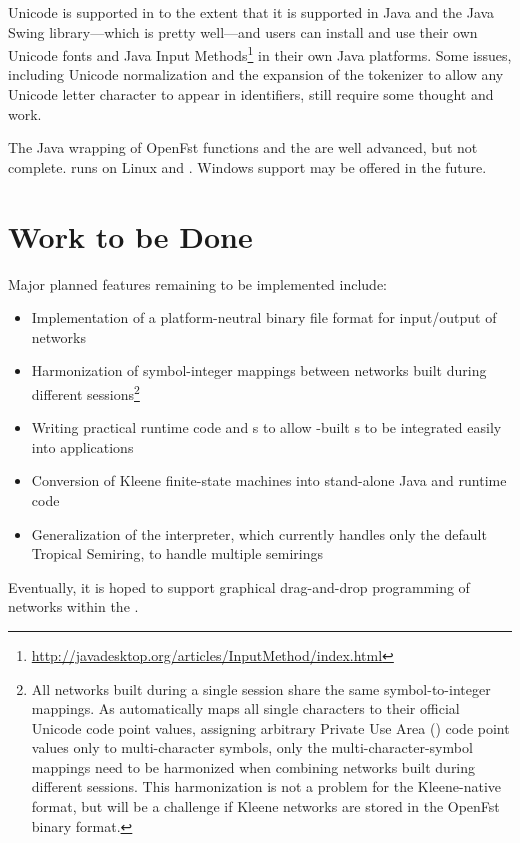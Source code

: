 \noindent
Unicode is supported in \Kleene{} to the extent that it is supported in
Java and the Java Swing library---which is pretty well---and users can
install and use their own Unicode fonts and Java Input
Methods\footnote{\url{http://javadesktop.org/articles/InputMethod/index.html}}
in their own Java platforms.  Some issues, including Unicode
normalization and the expansion of the \Kleene{} tokenizer to allow any
Unicode letter character to appear in identifiers, still require some
thought and work.

The Java wrapping of OpenFst functions and the  are well
advanced, but not complete.  \Kleene{} runs on Linux and .
Windows support may be offered in the future.

\section{Work to be Done}

Major planned features remaining to be implemented include:

\begin{itemize}
\item
Implementation of a platform-neutral binary file format for
input/output of networks
\item
Harmonization of symbol-integer mappings between networks built
during different \Kleene{} sessions\footnote{All
networks built during a single \Kleene{} session share the same symbol-to-integer mappings.  As
\Kleene{} automatically maps all single characters to their official Unicode code point values,
assigning arbitrary Private Use Area () code point values only to multi-character symbols, only the
multi-character-symbol mappings need to be harmonized when combining networks built
during different sessions.  This harmonization is not a problem for the Kleene-native 
format, but will be a challenge if Kleene networks are stored in the OpenFst binary format.}
\item
Writing practical runtime code and s to allow \Kleene{}-built \fst{}s to be integrated easily into
applications
\item
Conversion of Kleene finite-state machines into stand-alone Java and
\CPP{} runtime code
\item
Generalization of the interpreter, which currently handles only the default
Tropical Semiring, to handle multiple semirings
\end{itemize}

\noindent
Eventually, it is hoped to support graphical
drag-and-drop programming of networks within the .


